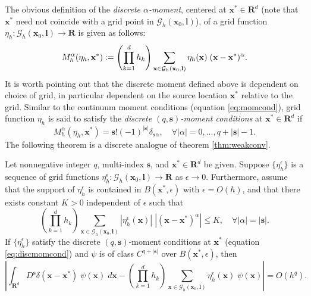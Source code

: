 The obvious definition of the \emph{discrete $\alpha$-moment}, centered at $\mathbf x^*\in\mathbf R^d$ (note that $\mathbf x^*$ need not coincide with a grid point in $\mathcal G_h(\mathbf x_0,\mathbf l)$), of a grid function $\eta_h:\mathcal G_h(\mathbf x_0,\mathbf l)\to \mathbf R$ is given as follows: 
\begin{equation*}\label{eq:def_discmom}
        M_h^\alpha(\eta_h,\mathbf x^*) := \left(\prod_{k=1}^{d} h_k \right) \sum_{\mathbf x\in\mathcal G_h(\mathbf x_0,\mathbf l)}  \eta_h(\mathbf x)\; ({\bf x}-{\bf x}^*)^{\alpha}.
\end{equation*}
It is worth pointing out that the discrete moment defined above is dependent on choice of grid, in particular dependent on the source location $\mathbf x^*$ relative to the grid.
Similar to the continuum moment conditions (equation \ref{eq:momcond}), grid function $\eta_h$ is said to satisfy the \emph{discrete $(q,\mathbf s)$-moment conditions} at $\mathbf x^*\in\mathbf R^d$ if
\begin{equation}\label{eq:discmomcond}
	M_h^\alpha(\eta_h,\mathbf x^*) = \mathbf s! (-1)^{|\mathbf s|} \delta_{\mathbf s \alpha}, \quad \forall |\alpha|=0,...,q+|\mathbf s|-1.
\end{equation}
The following theorem is a discrete analogue of theorem \ref{thm:weakconv}.

\begin{theorem}\label{thm:discweakconv}
Let nonnegative integer $q$, multi-index $\mathbf s$, and $\mathbf x^*\in\mathbf R^d$ be given.
Suppose $\{\eta_h^\epsilon\}$ is a sequence of grid functions $\eta_h^\epsilon:\mathcal G_h(\mathbf x_0,\mathbf l)\to\mathbf R$ as $\epsilon\to 0$.
Furthermore, assume that the support of $\eta_h^\epsilon$ is contained in $B(\mathbf x^*,\epsilon)$ with $\epsilon=O(h)$, and that there exists constant $K>0$ independent of $\epsilon$ such that
\begin{equation*}\label{eq:boundh}
	\left(\prod_{k=1}^d h_k \right) \sum_{\mathbf x\in\mathcal G_h(\mathbf x_0,\mathbf l)} |\eta_h^\epsilon(\mathbf x)|\; |(\mathbf x-\mathbf x^*)^{\alpha}| \le K, \quad \forall |\alpha| = |\mathbf s|.
\end{equation*}
If $\{\eta_h^\epsilon\}$ satisfy the discrete $(q,\mathbf s)$-moment conditions at $\mathbf x^*$ (equation \ref{eq:discmomcond}) and $\psi$ is of class $C^{q+|\mathbf s|}$ over $B(\mathbf x^*,\epsilon)$, then 
\[
	\left| \int_{\mathbf R^d} D^{\mathbf s}\delta(\mathbf x- \mathbf x^*) \;\psi(\mathbf x)\; d\mathbf x - \left(\prod_{k=1}^d h_k\right) \sum_{\mathbf x\in\mathcal G_h(\mathbf x_0,\mathbf l)}\eta_h^\epsilon (\mathbf x) \; \psi(\mathbf x)\right| = O(h^q).
\]
\end{theorem}

